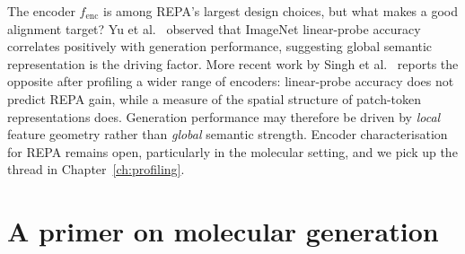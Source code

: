 \documentclass[12pt,a4paper,twoside]{report}
\begin{document}
The encoder $f_{\text{enc}}$ is among REPA's largest design choices, but what makes a good alignment target? Yu et al.~\cite{REPA} observed that ImageNet linear-probe accuracy correlates positively with generation performance, suggesting global semantic representation is the driving factor. More recent work by Singh et al.~\cite{SpatialStructure} reports the opposite after profiling a wider range of encoders: linear-probe accuracy does not predict REPA gain, while a measure of the spatial structure of patch-token representations does. Generation performance may therefore be driven by \emph{local} feature geometry rather than \emph{global} semantic strength. Encoder characterisation for REPA remains open, particularly in the molecular setting, and we pick up the thread in Chapter~\ref{ch:profiling}.


\section{A primer on molecular generation}
\label{sec:primer}
\end{document}
